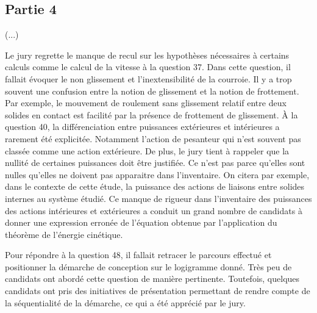 \documentclass[10pt,fleqn]{article} %
\begin{document}
\subsection*{Partie 4}
(...)

Le jury regrette le manque de recul sur les hypothèses nécessaires à certains calculs comme le calcul de la
vitesse à la question 37. Dans cette question, il fallait évoquer le non glissement et l’inextensibilité de la
courroie. Il y a trop souvent une confusion entre la notion de glissement et la notion de frottement. Par
exemple, le mouvement de roulement sans glissement relatif entre deux solides en contact est facilité par
la présence de frottement de glissement.
À la question 40, la différenciation entre puissances extérieures et intérieures a rarement été explicitée.
Notamment l’action de pesanteur qui n’est souvent pas classée comme une action extérieure. De plus, le
jury tient à rappeler que la nullité de certaines puissances doit être justifiée. Ce n’est pas parce qu’elles
sont nulles qu’elles ne doivent pas apparaitre dans l’inventaire. On citera par exemple, dans le contexte
de cette étude, la puissance des actions de liaisons entre solides internes au système étudié. Ce manque de
rigueur dans l’inventaire des puissances des actions intérieures et extérieures a conduit un grand nombre
de candidats à donner une expression erronée de l’équation obtenue par l’application du théorème de
l’énergie cinétique.

Pour répondre à la question 48, il fallait retracer le parcours effectué et positionner la démarche de conception sur le logigramme donné. Très peu de candidats ont abordé cette question de manière pertinente.
Toutefois, quelques candidats ont pris des initiatives de présentation permettant de rendre compte de la
séquentialité de la démarche, ce qui a été apprécié par le jury.




%
\end{document}
